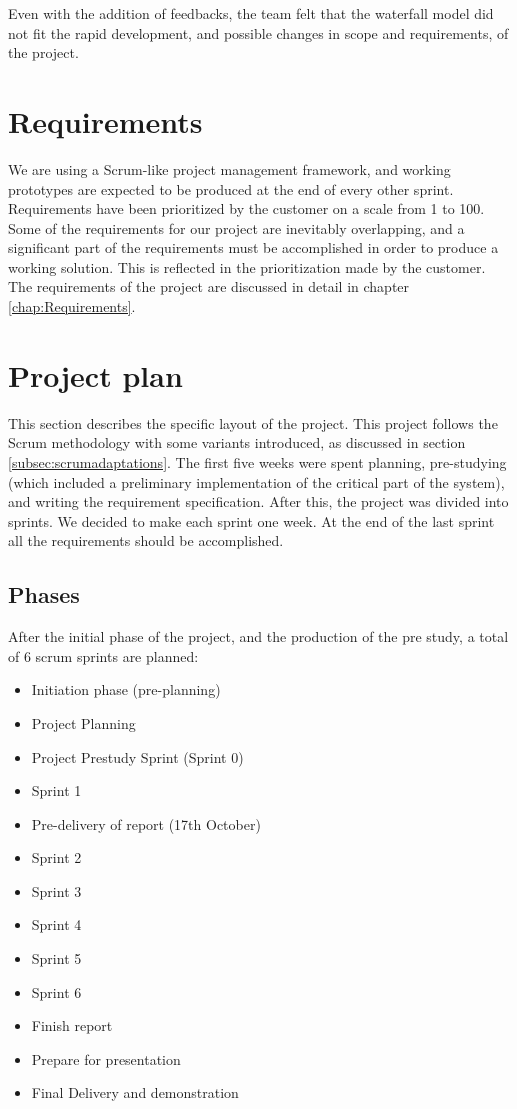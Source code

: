 \documentclass[11pt,a4paper,titlepage,oneside]{report}
\begin{document}
Even with the addition of feedbacks, the team felt that the waterfall model did not fit the rapid development, and possible changes in scope and requirements, of the project. 

\section{Requirements}
We are using a Scrum-like project management framework, and working prototypes are expected to be produced at the end of every other sprint. Requirements have been prioritized by the customer on a scale from 1 to 100. Some of the requirements for our project are inevitably overlapping, and a significant part of the requirements must be accomplished in order to produce a working solution. This is reflected in the prioritization made by the customer. The requirements of the project are discussed in detail in chapter \ref{chap:Requirements}.

\section{Project plan}
This section describes the specific layout of the project. This project follows the Scrum methodology with some variants introduced, as discussed in section \ref{subsec:scrumadaptations}. The first five weeks were spent planning, pre-studying (which included a preliminary implementation of the critical part of the system), and writing the requirement specification. After this, the project was divided into sprints. We decided to make each sprint one week. At the end of the last sprint all the requirements should be accomplished.

\subsection{Phases}
After the initial phase of the project, and the production of the pre study, a total of 6 scrum sprints are planned:
\begin{itemize}
\item Initiation phase (pre-planning)
\item Project Planning
\item Project Prestudy Sprint (Sprint 0)

\item Sprint 1
\item Pre-delivery of report (17th October)

\item Sprint 2
\item Sprint 3
\item Sprint 4
\item Sprint 5
\item Sprint 6

\item Finish report
\item Prepare for presentation
\item Final Delivery and demonstration
\end{itemize}
\end{document}
